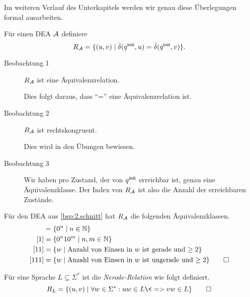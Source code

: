 Im weiteren Verlauf des Unterkapitels werden wir genau diese Überlegungen formal ausarbeiten.


\begin{Def} %
  \label{Bsp:R_m}
        Für einen \ac{DEA} $\mathcal{A}$ definiere
        \[ R_{\mathcal{A}} = \{(u,v) \mid \tilde\delta(q^\mathsf{init},u)=\tilde\delta(q^\mathsf{init},v)\}. \]
        \begin{description}
                \item[Beobachtung 1] $R_{\mathcal{A}}$ ist eine Äquivalenzrelation.
                
                Dies folgt daraus, dass "`="' eine Äquivalenzrelation ist.
                \item[Beobachtung 2] $R_{\mathcal{A}}$ ist rechtskongruent. 
                
                Dies wird in den Übungen bewiesen.
                \item[Beobachtung 3] Wir haben pro Zustand, der von $q^\mathsf{init}$ erreichbar ist, genau eine Äquivalenzklasse.
                Der Index von $R_{\mathcal{A}}$ ist also die Anzahl der erreichbaren Zustände.
        \end{description}
        
        \medskip
        
        Für den \ac{DEA} aus \autoref{bsp:2.schnitt} hat $R_{\mathcal{A}}$ die folgenden Äquivalenzklassen.
        \begin{align*}
        [\Eps] &= \{0^n\mid n\in \N\}\\
        [1] &= \{0^n10^m\mid n,m\in \N\}\\
        [11] &= \{w\mid \text{Anzahl von Einsen in $w$ ist gerade und $\geq 2$}\}\\
        [111] &= \{w\mid \text{Anzahl von Einsen in $w$ ist ungerade und $\geq 2$}\}
        \qedhere
        \end{align*}
\end{Def}
\begin{Def}
        Für eine Sprache $L\subseteq \Sigma^*$ ist die \emph{Nerode-Relation} wie folgt definiert.
        \[
        R_L = \{(u,v) \mid \forall w\in\Sigma^*: uw\in L \<=> vw\in L \}
        \qedhere
        \]
\end{Def}
